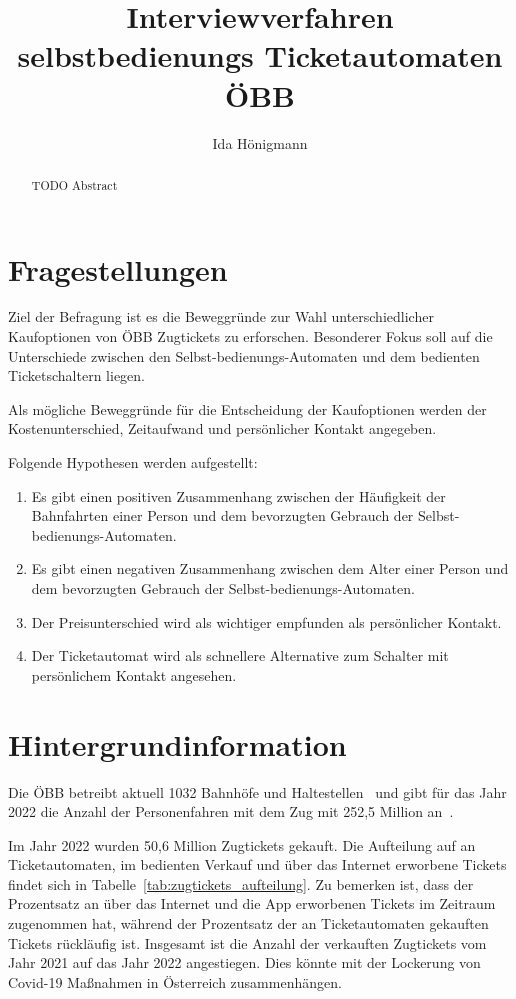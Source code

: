 \documentclass[]{article}
\title{Interviewverfahren\\ selbstbedienungs Ticketautomaten ÖBB}
\author{Ida Hönigmann}
\begin{document}
\maketitle

\begin{abstract}
	TODO Abstract
\end{abstract}

\section{Fragestellungen}
\label{sec:fragestellungen}

Ziel der Befragung ist es die Beweggründe zur Wahl unterschiedlicher Kaufoptionen von ÖBB Zugtickets zu erforschen. Besonderer Fokus soll auf die Unterschiede zwischen den Selbst-bedienungs-Automaten und dem bedienten Ticketschaltern liegen.

Als mögliche Beweggründe für die Entscheidung der Kaufoptionen werden der Kostenunterschied, Zeitaufwand und persönlicher Kontakt angegeben.

Folgende Hypothesen werden aufgestellt:

\begin{enumerate}[label={H\arabic*: }]
	\item Es gibt einen positiven Zusammenhang zwischen der Häufigkeit der Bahnfahrten einer Person und dem bevorzugten Gebrauch der Selbst-bedienungs-Automaten.
	\item Es gibt einen negativen Zusammenhang zwischen dem Alter einer Person und dem bevorzugten Gebrauch der Selbst-bedienungs-Automaten.
	\item Der Preisunterschied wird als wichtiger empfunden als persönlicher Kontakt.
	\item Der Ticketautomat wird als schnellere Alternative zum Schalter mit persönlichem Kontakt angesehen.
\end{enumerate}


\section{Hintergrundinformation}
Die ÖBB betreibt aktuell 1032 Bahnhöfe und Haltestellen~\cite{oebbinfra_zahlendatenfakten2022} und gibt für das Jahr 2022 die Anzahl der Personenfahren mit dem Zug mit 252,5 Million an~\cite{oebb_zahlendatenfakten202223}.

Im Jahr 2022 wurden 50,6 Million Zugtickets gekauft. Die Aufteilung auf an Ticketautomaten, im bedienten Verkauf und über das Internet erworbene Tickets findet sich in Tabelle~\ref{tab:zugtickets_aufteilung}. Zu bemerken ist, dass der Prozentsatz an über das Internet und die App erworbenen Tickets im Zeitraum zugenommen hat, während der Prozentsatz der an Ticketautomaten gekauften Tickets rückläufig ist. Insgesamt ist die Anzahl der verkauften Zugtickets vom Jahr 2021 auf das Jahr 2022 angestiegen. Dies könnte mit der Lockerung von Covid-19 Maßnahmen in Österreich zusammenhängen.
\end{document}
